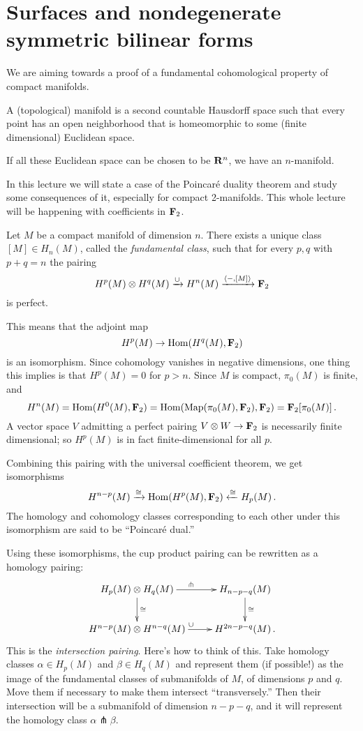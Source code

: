 \section{Surfaces and nondegenerate symmetric bilinear forms}

We are aiming towards a proof of a fundamental cohomological property of
compact manifolds. 

\begin{definition} A (topological) manifold is a second countable 
Hausdorff space such that
every point has an open neighborhood that is homeomorphic to some (finite
dimensional) Euclidean space. 
\end{definition}

If all these Euclidean space can be chosen to be $\mathbf R^n$, we have an 
$n$-manifold. 

In this lecture we will state a case of the Poincar\'e duality theorem
and study some consequences of it, especially for compact 2-manifolds. 
This whole lecture will be happening with coefficients in $\mathbf F_2$. 

\begin{theorem}
Let $M$ be a compact manifold of dimension $n$.  
There exists a unique class $[M]\in H_n(M)$, called the {\em fundamental class}, such that for every $p,q$ with $p+q=n$ the pairing 
\[
H^p(M)\otimes H^q(M)\xrightarrow{\cup} H^n(M)\xrightarrow{\langle -,[M]\rangle}\mathbf F_2
\]
is perfect. 
\end{theorem}
This means that the adjoint map
\[
H^p(M)\to\operatorname{Hom}(H^q(M),\mathbf F_2)
\]
is an isomorphism. Since cohomology vanishes in negative dimensions, one thing
this implies is that $H^p(M)=0$ for $p>n$. Since $M$ is compact, $\pi_0(M)$
is finite, and 
\[
H^n(M)=\operatorname{Hom}(H^0(M),\mathbf F_2)=\operatorname{Hom}(\operatorname{Map}(\pi_0(M),\mathbf F_2),\mathbf F_2)=\mathbf F_2[\pi_0(M)]\,.
\]
A vector space $V$ admitting a perfect pairing $V\otimes W\to\mathbf F_2$
is necessarily finite dimensional; so $H^p(M)$ is in fact finite-dimensional 
for all $p$.

Combining this pairing with the universal coefficient theorem, we get 
isomorphisms
\[
H^{n-p}(M)\xrightarrow{\cong}\operatorname{Hom}(H^p(M),\mathbf F_2)\xleftarrow{\cong}H_p(M)\,.
\]
The homology and cohomology classes corresponding to each other under this 
isomorphism are said to be ``Poincar\'e dual.'' 

Using these isomorphisms, the cup product pairing can be rewritten as a
homology pairing:
\[
\xymatrix{
H_p(M)\otimes H_q(M) \ar[r]^\pitchfork \ar[d]^\cong & 
H_{n-p-q}(M) \ar[d]^\cong \\
H^{n-p}(M)\otimes H^{n-q}(M) \ar[r]^\cup & H^{2n-p-q}(M)\,.
}\]
This is the {\em intersection pairing}. Here's how to think of this. 
Take homology classes $\alpha\in H_p(M)$ and $\beta\in H_q(M)$ and
represent them (if possible!) as the image of the fundamental classes
of submanifolds of $M$, of dimensions $p$ and $q$. 
Move them if necessary to make them intersect ``transversely.''
Then their intersection will be a submanifold of dimension
$n-p-q$, and it will represent the homology class $\alpha\pitchfork\beta$.

